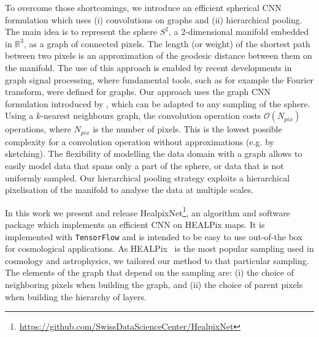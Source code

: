 \documentclass[final,twocolumn,3p,times,authoryear]{elsarticle}
\newcommand{\nati}[1]{{\color[rgb]{.1,.6,.1}{#1}}}
\newcommand{\TK}[1]{{\color{red}{TK:#1}}}
\newcommand{\todo}[1]{{\color[rgb]{.6,.1,.6}{#1}}}
\newcommand{\1}{\b{1}}              %
\newcommand{\0}{\b{0}}              %
\newcommand{\pkg}[1]{\texttt{#1}}
\begin{document}
To overcome those shortcomings, we introduce an efficient spherical CNN formulation which uses (i) convolutions on graphs and (ii) hierarchical pooling.
The main idea is to represent the sphere $S^2$, a 2-dimensional manifold embedded in $\mathbb{R}^3$, as a graph of connected pixels.
The length (or weight) of the shortest path between two pixels is an approximation of the geodesic distance between them on the manifold.
The use of this approach is enabled by recent developments in graph signal processing, where fundamental tools, such as for example the Fourier transform, were defined \citep{shuman2013emerging} for graphs.
Our approach uses the graph CNN formulation introduced by \citet{defferrard2016convolutional}, which can be adapted to any sampling of the sphere.
Using a $k$-nearest neighbours graph, the convolution operation costs $\mathcal{O}(N_{pix})$ operations, where $N_{pix}$ is the number of pixels.
This is the lowest possible complexity for a convolution operation without approximations (e.g. by sketching).
The flexibility of modelling the data domain with a graph allows to easily model data that spans only a part of the sphere, or data that is not uniformly sampled.
Our hierarchical pooling strategy exploits a hierarchical pixelisation of the manifold to analyse the data at multiple scales.

In this work we present and release HealpixNet\footnote{\url{https://github.com/SwissDataScienceCenter/HealpixNet}}, an algorithm and software package which implements an efficient CNN on HEALPix maps. It is implemented with \pkg{TensorFlow} \citep{abadi2016tensorflow} and is intended to be easy to use out-of-the box for cosmological applications.
As HEALPix~\citep{gorski2005healpix} is the most popular sampling used in cosmology and astrophysics, we tailored our method to that particular sampling.
The elements of the graph that depend on the sampling are:
(i) the choice of neighboring pixels when building the graph, and
(ii) the choice of parent pixels when building the hierarchy of layers.
\end{document}
